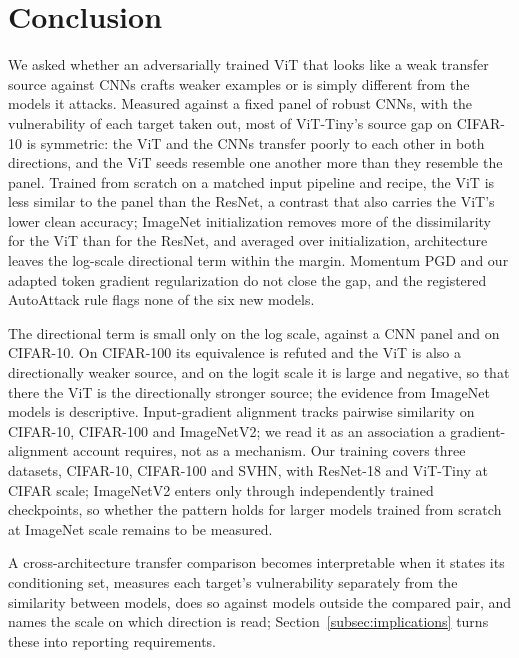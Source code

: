 \section{Conclusion}
\label{sec:conclusion}

We asked whether an adversarially trained ViT that looks like a weak transfer source against CNNs crafts weaker examples or is simply different from the models it attacks. Measured against a fixed panel of robust CNNs, with the vulnerability of each target taken out, most of ViT-Tiny's source gap on CIFAR-10 is symmetric: the ViT and the CNNs transfer poorly to each other in both directions, and the ViT seeds resemble one another more than they resemble the panel. Trained from scratch on a matched input pipeline and recipe, the ViT is less similar to the panel than the ResNet, a contrast that also carries the ViT's lower clean accuracy; ImageNet initialization removes more of the dissimilarity for the ViT than for the ResNet, and averaged over initialization, architecture leaves the log-scale directional term within the margin. Momentum PGD and our adapted token gradient regularization do not close the gap, and the registered AutoAttack rule flags none of the six new models.

The directional term is small only on the log scale, against a CNN panel and on CIFAR-10. On CIFAR-100 its equivalence is refuted and the ViT is also a directionally weaker source, and on the logit scale it is large and negative, so that there the ViT is the directionally stronger source; the evidence from ImageNet models is descriptive. Input-gradient alignment tracks pairwise similarity on CIFAR-10, CIFAR-100 and ImageNetV2; we read it as an association a gradient-alignment account requires, not as a mechanism. Our training covers three datasets, CIFAR-10, CIFAR-100 and SVHN, with ResNet-18 and ViT-Tiny at CIFAR scale; ImageNetV2 enters only through independently trained checkpoints, so whether the pattern holds for larger models trained from scratch at ImageNet scale remains to be measured.

A cross-architecture transfer comparison becomes interpretable when it states its conditioning set, measures each target's vulnerability separately from the similarity between models, does so against models outside the compared pair, and names the scale on which direction is read; Section~\ref{subsec:implications} turns these into reporting requirements.
